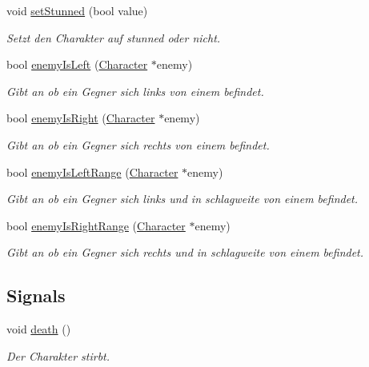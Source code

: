 \begin{DoxyCompactItemize}
void \hyperlink{class_character_a374c40a183c8c1795b10004a07b36fd7}{set\+Stunned} (bool value)
\begin{DoxyCompactList}\small\item\em Setzt den Charakter auf stunned oder nicht. \end{DoxyCompactList}\item 
bool \hyperlink{class_character_a2960bf6a336ffdfac0d19d0909ceb1dd}{enemy\+Is\+Left} (\hyperlink{class_character}{Character} $\ast$enemy)
\begin{DoxyCompactList}\small\item\em Gibt an ob ein Gegner sich links von einem befindet. \end{DoxyCompactList}\item 
bool \hyperlink{class_character_aea3908941f3be893dc1964b224e74825}{enemy\+Is\+Right} (\hyperlink{class_character}{Character} $\ast$enemy)
\begin{DoxyCompactList}\small\item\em Gibt an ob ein Gegner sich rechts von einem befindet. \end{DoxyCompactList}\item 
bool \hyperlink{class_character_aa4848867a1029966d670d5f492301308}{enemy\+Is\+Left\+Range} (\hyperlink{class_character}{Character} $\ast$enemy)
\begin{DoxyCompactList}\small\item\em Gibt an ob ein Gegner sich links und in schlagweite von einem befindet. \end{DoxyCompactList}\item 
bool \hyperlink{class_character_a6ae029174982ef952b074097789db3a4}{enemy\+Is\+Right\+Range} (\hyperlink{class_character}{Character} $\ast$enemy)
\begin{DoxyCompactList}\small\item\em Gibt an ob ein Gegner sich rechts und in schlagweite von einem befindet. \end{DoxyCompactList}\end{DoxyCompactItemize}
\subsection*{Signals}
\begin{DoxyCompactItemize}
\item 
void \hyperlink{class_character_a127f5ee58b01289418cf080a8328b6c7}{death} ()
\begin{DoxyCompactList}\small\item\em Der Charakter stirbt. \end{DoxyCompactList}\end{DoxyCompactItemize}
